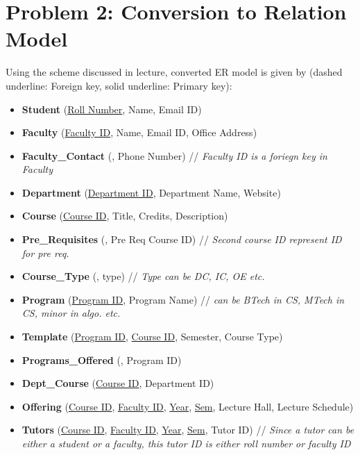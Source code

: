 \documentclass[a4paper]{article}
\begin{document}
\section*{Problem 2: Conversion to Relation Model}
Using the scheme discussed in lecture, converted ER model is given by (dashed underline: Foreign key, solid underline: Primary key):
\begin{itemize}
	\item \textbf{Student} (\underline{Roll Number}, Name, Email ID)

	\item \textbf{Faculty} (\underline{Faculty ID}, Name, Email ID, Office Address)

	\item \textbf{Faculty\_Contact} (, Phone Number) // \textit{Faculty ID is a foriegn key in Faculty}

	\item \textbf{Department} (\underline{Department ID}, Department Name, Website)

	\item \textbf{Course} (\underline{Course ID}, Title, Credits, Description)

	\item \textbf{Pre\_Requisites} (, Pre Req Course ID) // \textit{Second course ID represent ID for pre req.}

	\item \textbf{Course\_Type} (, type) // \textit{Type can be DC, IC, OE etc.}

	\item \textbf{Program} (\underline{Program ID}, Program Name) // \textit{can be BTech in CS, MTech in CS, minor in algo. etc.}

	\item \textbf{Template} (\underline{Program ID}, \underline{Course ID}, Semester, Course Type)

	\item \textbf{Programs\_Offered} (, Program ID)

	\item \textbf{Dept\_Course} (\underline{Course ID}, Department ID)

	\item \textbf{Offering} (\underline{Course ID}, \underline{Faculty ID}, \underline{Year}, \underline{Sem}, Lecture Hall, Lecture Schedule)

	\item \textbf{Tutors} (\underline{Course ID}, \underline{Faculty ID}, \underline{Year}, \underline{Sem}, Tutor ID) // \textit{Since a tutor can be either a student or a faculty, this tutor ID is either roll number or faculty ID}


\end{itemize}
\end{document}
